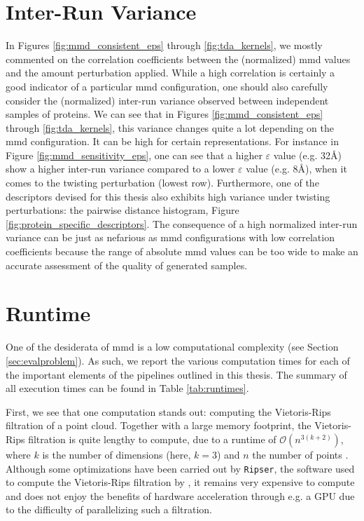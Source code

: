 \section{Inter-Run Variance}

In Figures \ref{fig:mmd_consistent_eps} through \ref{fig:tda_kernels}, we mostly
commented on the correlation coefficients between the (normalized) \acrshort{mmd} values
and the amount perturbation applied. While a high correlation is certainly a
good indicator of a particular \acrshort{mmd} configuration, one should also carefully
consider the (normalized) inter-run variance observed between independent
samples of proteins. We can see that in Figures \ref{fig:mmd_consistent_eps}
through \ref{fig:tda_kernels}, this variance changes quite a lot depending on
the \acrshort{mmd} configuration. It can be high for certain representations.
For instance in Figure \ref{fig:mmd_sensitivity_eps}, one can see that a higher
$\varepsilon$ value (e.g. 32\si{\angstrom}) show a higher inter-run variance
compared to a lower $\varepsilon$ value (e.g. 8\si{\angstrom}), when
it comes to the twisting perturbation (lowest row). Furthermore, one of the
descriptors devised for this thesis also exhibits high variance under twisting
perturbations: the pairwise distance histogram, Figure
\ref{fig:protein_specific_descriptors}. The consequence of a high normalized
inter-run variance can be just as nefarious as \acrshort{mmd} configurations with low
correlation coefficients because the range of absolute \acrshort{mmd} values can be too wide
to make an accurate assessment of the quality of generated samples.


\section{Runtime}\label{sec:results_runtime}

One of the desiderata of \acrshort{mmd} is a low computational complexity (see Section
\ref{sec:evalproblem}). As such, we report the various computation times for
each of the important elements of the pipelines outlined in this thesis. The
summary of all execution times can be found in Table \ref{tab:runtimes}.

First, we see that one computation stands out: computing the Vietoris-Rips
filtration of a point cloud. Together with a large memory footprint, the
Vietoris-Rips filtration is quite lengthy to compute, due to a runtime of
$\mathcal{O}(n^{3(k+2)})$, where $k$ is the number of dimensions (here, $k=3$)
and $n$ the number of points \citep{adams2018persistent}. Although some optimizations have been carried out
by \texttt{Ripser}, the software used to compute the Vietoris-Rips filtration by
\cite{Bauer2021Ripser},
it remains very expensive to compute and does not enjoy the benefits of hardware
acceleration through e.g. a GPU due to the difficulty of parallelizing such a
filtration.

